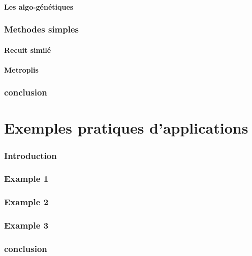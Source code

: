 \documentclass[a4paper,11pt,oneside]{report}
\theoremstyle{plain}
\newcommand{\0}{/ \! \! \! 0}
\theoremstyle{plain}
\begin{document}
\subsubsection{Les algo-g\'en\'etiques}

\subsection{Methodes simples}

\subsubsection{Recuit simil\'e}

\subsubsection{Metroplis}

\subsection{conclusion}

\chapter{Exemples pratiques d'applications}
\minitoc
\subsection{Introduction}

\subsection{Example 1}

\subsection{Example 2}

\subsection{Example 3}

\subsection{conclusion}
\end{document}
